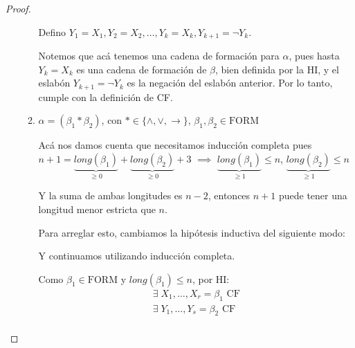 \begin{proof}
\begin{itemize}
\begin{enumerate}
                \medskip

                Defino $Y_1 = X_1, Y_2 = X_2, \dotsc, Y_k = X_k, 
                Y_{k+1}=\neg Y_k$.

                \medskip

                Notemos que acá tenemos una cadena de formación para $\alpha$,
                pues hasta $Y_k = X_k$ es una cadena de formación de $\beta$,
                bien definida por la HI, y el eslabón $Y_{k+1} = \neg Y_k$ es
                la negación del eslabón anterior. Por lo tanto, cumple con
                la definición de CF.

            \item $\alpha = (\beta_1 * \beta_2)$, con 
                $* \in \{ \wedge, \vee, \to \}$, 
                $\beta_1, \beta_2 \in \mathrm{FORM}$

                \medskip

                Acá nos damos cuenta que necesitamos inducción completa
                pues $n+1 = \underbrace{long(\beta_1)}_{\geq 0} +
                \underbrace{long(\beta_2)}_{\geq 0} + 3$ 
                $\implies$ $\underbrace{long(\beta_1)}_{\geq 1} \leq n$, 
                $\underbrace{long(\beta_2)}_{\geq 1} \leq n$

                Y la suma de ambas longitudes es $n-2$, entonces $n+1$ puede
                tener una longitud menor estricta que $n$.
                

                Para arreglar esto, cambiamos la hipótesis inductiva del 
                siguiente modo:

                \begin{center}
                \end{center}

                Y continuamos utilizando inducción completa.


                Como $\beta_1 \in \mathrm{FORM}$ y $long(\beta_1) \leq n$, por HI:
                \begin{gather*}
                    \exists \; X_1, \dotsc, X_r = \beta_1 \text{ CF} \\
                    \exists \; Y_1, \dotsc, Y_s = \beta_2 \text{ CF} \\
                \end{gather*}


\end{enumerate}
\end{itemize}
\end{proof}
